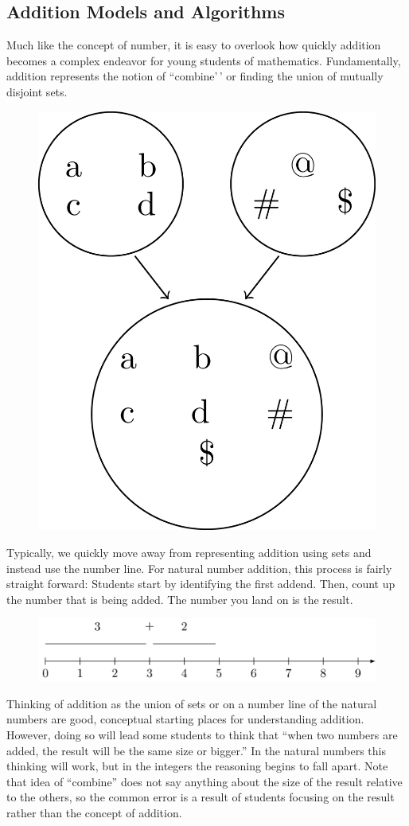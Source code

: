 \documentclass[
]{book}
\theoremstyle{definition}
\theoremstyle{definition}
\theoremstyle{definition}
\theoremstyle{definition}
\theoremstyle{remark}
\begin{document}
\hypertarget{addition-models-and-algorithms}{%
\subsection{Addition Models and Algorithms}\label{addition-models-and-algorithms}}

Much like the concept of number, it is easy to overlook how quickly addition becomes a complex endeavor for young students of mathematics. Fundamentally, addition represents the notion of ``combine'\,' or finding the union of mutually disjoint sets.

\begin{figure}

{\centering \includegraphics[width=0.3\linewidth]{tikz/addition-model-set} 

}

\end{figure}

Typically, we quickly move away from representing addition using sets and instead use the number line. For natural number addition, this process is fairly straight forward: Students start by identifying the first addend. Then, count up the number that is being added. The number you land on is the result.

\begin{figure}

{\centering \includegraphics[width=0.6\linewidth]{tikz/addition-model-numberline} 

}

\end{figure}

Thinking of addition as the union of sets or on a number line of the natural numbers are good, conceptual starting places for understanding addition. However, doing so will lead some students to think that ``when two numbers are added, the result will be the same size or bigger.'' In the natural numbers this thinking will work, but in the integers the reasoning begins to fall apart. Note that idea of ``combine'' does not say anything about the size of the result relative to the others, so the common error is a result of students focusing on the result rather than the concept of addition.
\end{document}
